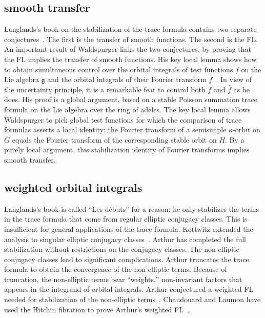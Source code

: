 \documentclass[brochure,english,12pt]{bourbaki}
\def\g{\mathfrak{g}}
\begin{document}
\subsection{smooth transfer}

Langlands's book on the stabilization of the trace formula contains
two separate conjectures~\cite{Langlands:debuts}.  The first is the transfer of smooth
functions.  The second is the FL.  An important result
of Waldspurger links the two conjectures, by proving that the
FL implies the transfer of smooth functions.  
His key local lemma shows how to obtain simultaneous control over the
orbital integrals of test functions $f$ on the Lie algebra $\g$ and the orbital integrals of
their Fourier transform $\hat f$~\cite[Prop.~8.2]{Wald:transfert}.  
In view of the uncertainty principle, it is a remarkable feat to
control both $f$ and $\hat f$ as he does.
His proof is a global argument, based on a stable Poisson summation
trace formula on the Lie algebra over the ring of adeles.  The key local lemma allows
Waldspurger to pick global test functions for which the comparison of
trace formulas asserts a local identity: the Fourier transform of a
semisimple $\kappa$-orbit on $G$ equals the Fourier transform of the
corresponding stable orbit on $H$.  By a purely local argument, this
stabilization identity of Fourier transforms  implies smooth transfer.


\subsection{weighted orbital integrals}

Langlands's book is called ``Les d\'ebuts'' for a reason: he only
stabilizes the terms in the trace formula that come from regular
elliptic conjugacy classes.  This is insufficient for general
applications of the trace formula.  Kottwitz extended the analysis to
singular elliptic conjugacy classes~\cite{Kott:singular}.  Arthur has
completed the full stabilization without restrictions on the conjugacy
classes.  The non-elliptic conjugacy classes lead to significant
complications.  Arthur truncates the trace formula to obtain the
convergence of the non-elliptic terms.  Because of truncation, the
non-elliptic terms bear ``weights,'' non-invariant factors that
appears in the integrand of orbital integrals.  Arthur conjectured a
weighted FL needed for stabilization of the non-elliptic
terms~\cite{Arthur:2002}.  Chaudouard and Laumon have used the Hitchin
fibration to prove Arthur's weighted
FL~\cite{CL:2009:I},\cite{CL:2009:II}.
\end{document}
